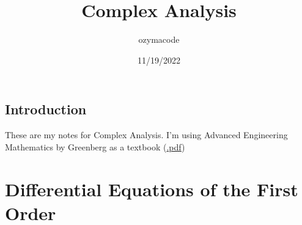 \documentclass{report}
\title{\Huge{Complex Analysis}}
\author{\huge{ozymacode}}
\date{11/19/2022}
\begin{document}
\maketitle
\newpage%
\tableofcontents
\pagebreak



\section{Introduction}
    These are my notes for Complex Analysis. I'm using Advanced Engineering Mathematics by Greenberg as a textbook (\href{https://library.uoh.edu.iq/admin/ebooks/34632-greenberg---advanced-engineering-mathematics-(1999).pdf}{.pdf})

\setcounter{chapter}{1}
\chapter{Differential Equations of the First Order}
    \setcounter{section}{4}
\end{document}

